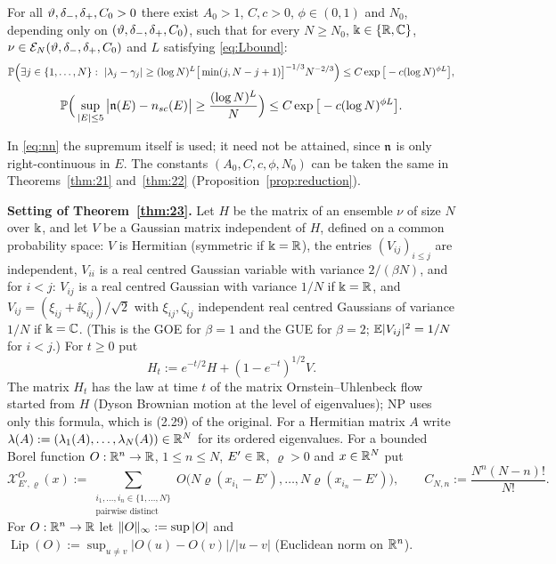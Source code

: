 \begin{theorem}\label{thm:22}
For all $\vartheta,\delta_-,\delta_+,C_0>0$ there exist $A_0>1$, $C,c>0$, $\phi\in(0,1)$ and $N_0$, depending only on
$(\vartheta,\delta_-,\delta_+,C_0)$, such that for every $N\ge N_0$, $\Bbbk\in\{\mathbb{R},\mathbb{C}\}$, $\nu\in\mathcal E_N(\vartheta,\delta_-,\delta_+,C_0)$ and $L$ satisfying \eqref{eq:Lbound}:
\begin{equation}\label{eq:rigidity}
 \mathbb{P}\Big(\exists j\in\{1,\dots,N\}:\ |\lambda_j-\gamma_j|\ge(\log N)^L\big[\min(j,N-j+1)\big]^{-1/3}N^{-2/3}\Big)\le C\exp\big[-c(\log N)^{\phi L}\big],
\end{equation}
\begin{equation}\label{eq:nn}
 \mathbb{P}\Big(\sup_{|E|\le5}\big|\mathfrak{n}(E)-n_{sc}(E)\big|\ge\frac{(\log N)^L}{N}\Big)\le C\exp\big[-c(\log N)^{\phi L}\big].
\end{equation}
\end{theorem}
\noindent In \eqref{eq:nn} the supremum itself is used; it need not be attained, since $\mathfrak{n}$ is only right-continuous in $E$. The constants $(A_0,C,c,\phi,N_0)$ can be taken
the same in Theorems~\ref{thm:21} and~\ref{thm:22} (Proposition~\ref{prop:reduction}).

\medskip
\noindent\textbf{Setting of Theorem~\ref{thm:23}.} Let $H$ be the matrix of an ensemble $\nu$ of size $N$ over $\Bbbk$, and let $V$ be a Gaussian matrix independent of $H$, defined on a common probability space:
$V$ is Hermitian (symmetric if $\Bbbk=\mathbb{R}$), the entries $(V_{ij})_{i\le j}$ are independent, $V_{ii}$ is a real centred Gaussian variable with variance $2/(\beta N)$, and for $i<j$:
$V_{ij}$ is a real centred Gaussian with variance $1/N$ if $\Bbbk=\mathbb{R}$, and $V_{ij}=(\xi_{ij}+\ii\zeta_{ij})/\sqrt2$ with $\xi_{ij},\zeta_{ij}$ independent real centred Gaussians of variance $1/N$ if $\Bbbk=\mathbb{C}$.
(This is the GOE for $\beta=1$ and the GUE for $\beta=2$; $\mathbb{E}|V_{ij}|^2=1/N$ for $i<j$.) For $t\ge0$ put
\[
 H_t:=e^{-t/2}H+(1-e^{-t})^{1/2}V .
\]
The matrix $H_t$ has the law at time $t$ of the matrix Ornstein--Uhlenbeck flow started from $H$ (Dyson Brownian motion at the level of eigenvalues); NP uses only this formula, which is (2.29) of the original.
For a Hermitian matrix $A$ write $\lambda(A):=(\lambda_1(A),\dots,\lambda_N(A))\in\mathbb{R}^N$ for its ordered eigenvalues.
For a bounded Borel function $O:\mathbb{R}^n\to\mathbb{R}$, $1\le n\le N$, $E'\in\mathbb{R}$, $\varrho>0$ and $x\in\mathbb{R}^N$ put
\[
 \mathcal X^{O}_{E',\varrho}(x):=\sum_{\substack{i_1,\dots,i_n\in\{1,\dots,N\}\\ \text{pairwise distinct}}}O\big(N\varrho(x_{i_1}-E'),\dots,N\varrho(x_{i_n}-E')\big),\qquad C_{N,n}:=\frac{N^n(N-n)!}{N!}.
\]
For $O:\mathbb{R}^n\to\mathbb{R}$ let $\|O\|_\infty:=\sup|O|$ and $\operatorname{Lip}(O):=\sup_{u\ne v}|O(u)-O(v)|/|u-v|$ (Euclidean norm on $\mathbb{R}^n$).


